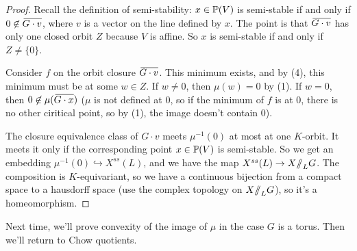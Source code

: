 \begin{proof}
 Recall the definition of semi-stability: $x\in \mathbb{P}(V)$ is semi-stable if and only if $0\not\in \bbar{G\cdot v}$, where $v$ is a vector on the line defined by $x$. The point is that $\bbar{G\cdot v}$ has only one closed orbit $Z$ because $V$ is affine. So $x$ is semi-stable if and only if $Z\neq \{0\}$.
 
 Consider $f$ on the orbit closure $\bbar{G\cdot v}$. This minimum exists, and by (4), this minimum must be at some $w\in Z$. If $w\neq 0$, then $\mu(w)=0$ by (1). If $w=0$, then $0\not\in\mu(\bbar{G\cdot x})$ ($\mu$ is not defined at $0$, so if the minimum of $f$ is at $0$, there is no other ciritical point, so by (1), the image doesn't contain $0$).
 
 The closure equivalence class of $G\cdot v$ meets $\mu^{-1}(0)$ at most at one $K$-orbit. It meets it only if the corresponding point $x\in \mathbb{P}(V)$ is semi-stable. So we get an embedding $\mu^{-1}(0)\hookrightarrow X^{ss}(L)$, and we have the map $X^{ss}(L)\to X\mbox{\rm /\!\!/}_L G$. The composition is $K$-equivariant, so we have a continuous bijection from a compact space to a hausdorff space (use the complex topology on $X\mbox{\rm /\!\!/}_L G$), so it's a homeomorphism.
\end{proof}
Next time, we'll prove convexity of the image of $\mu$ in the case $G$ is a torus. Then we'll return to Chow quotients.

